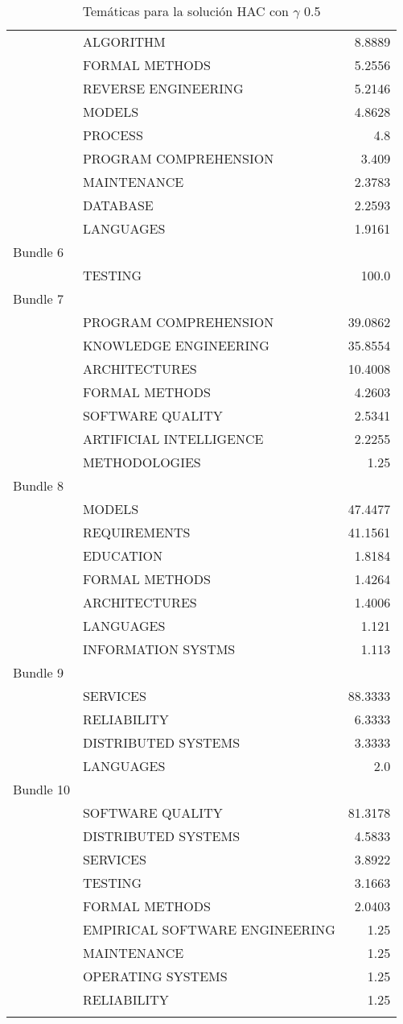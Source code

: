 \begin{center}
\begin{longtable}{|llr|}
 ~ & ALGORITHM & 8.8889 \\
 ~ & FORMAL METHODS & 5.2556 \\
 ~ & REVERSE ENGINEERING & 5.2146 \\
 ~ & MODELS & 4.8628 \\
 ~ & PROCESS & 4.8 \\
 ~ & PROGRAM COMPREHENSION & 3.409 \\
 ~ & MAINTENANCE & 2.3783 \\
 ~ & DATABASE & 2.2593 \\
 ~ & LANGUAGES & 1.9161 \\
Bundle 6 & ~ & ~ \\
 ~ & TESTING & 100.0 \\
Bundle 7 & ~ & ~ \\
 ~ & PROGRAM COMPREHENSION & 39.0862 \\
 ~ & KNOWLEDGE ENGINEERING & 35.8554 \\
 ~ & ARCHITECTURES & 10.4008 \\
 ~ & FORMAL METHODS & 4.2603 \\
 ~ & SOFTWARE QUALITY & 2.5341 \\
 ~ & ARTIFICIAL INTELLIGENCE & 2.2255 \\
 ~ & METHODOLOGIES & 1.25 \\
Bundle 8 & ~ & ~ \\
 ~ & MODELS & 47.4477 \\
 ~ & REQUIREMENTS & 41.1561 \\
 ~ & EDUCATION & 1.8184 \\
 ~ & FORMAL METHODS & 1.4264 \\
 ~ & ARCHITECTURES & 1.4006 \\
 ~ & LANGUAGES & 1.121 \\
 ~ & INFORMATION SYSTMS & 1.113 \\
Bundle 9 & ~ & ~ \\
 ~ & SERVICES & 88.3333 \\
 ~ & RELIABILITY & 6.3333 \\
 ~ & DISTRIBUTED SYSTEMS & 3.3333 \\
 ~ & LANGUAGES & 2.0 \\
Bundle 10 & ~ & ~ \\
 ~ & SOFTWARE QUALITY & 81.3178 \\
 ~ & DISTRIBUTED SYSTEMS & 4.5833 \\
 ~ & SERVICES & 3.8922 \\
 ~ & TESTING & 3.1663 \\
 ~ & FORMAL METHODS & 2.0403 \\
 ~ & EMPIRICAL SOFTWARE ENGINEERING & 1.25 \\
 ~ & MAINTENANCE & 1.25 \\
 ~ & OPERATING SYSTEMS & 1.25 \\
 ~ & RELIABILITY & 1.25 \\
    \hline
  \caption {Temáticas para la solución HAC con $\gamma$ 0.5}
\end{longtable}
\end{center}

